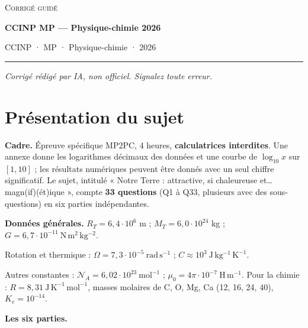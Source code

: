 \documentclass[11pt,a4paper]{article}
\begin{document}
\thispagestyle{plain}
\begin{center}
  {\small\scshape Corrigé guidé}\par\smallskip
  {\LARGE\bfseries CCINP MP — Physique-chimie 2026\par}\medskip
  {\large CCINP · MP · Physique-chimie · 2026\par}
\end{center}
\vspace{2pt}\hrule\vspace{8pt}

\emph{Corrigé rédigé par IA, non officiel. Signalez toute erreur.}

\hypertarget{pruxe9sentation-du-sujet}{%
\section{Présentation du sujet}\label{pruxe9sentation-du-sujet}}

\textbf{Cadre.} Épreuve spécifique MP2PC, 4 heures, \textbf{calculatrices interdites}. Une annexe donne les logarithmes décimaux des données et une courbe de \(\log_{10}x\) sur \([1,10]\) ; les résultats numériques peuvent être donnés avec un seul chiffre significatif. Le sujet, intitulé « Notre Terre : attractive, si chaleureuse et\ldots{} magn(if)(ét)ique », compte \textbf{33 questions} (Q1 à Q33, plusieurs avec des sous-questions) en six parties indépendantes.

\textbf{Données générales.} \(R_T=6{,}4\cdot10^6\) m ; \(M_T=6{,}0\cdot10^{24}\) kg ; \(G=6{,}7\cdot10^{-11}\ \mathrm{N\,m^2\,kg^{-2}}\).

Rotation et thermique : \(\Omega=7{,}3\cdot10^{-5}\ \mathrm{rad\,s^{-1}}\) ; \(C\approx10^3\ \mathrm{J\,kg^{-1}\,K^{-1}}\).

Autres constantes : \(\mathcal N_A=6{,}02\cdot10^{23}\ \mathrm{mol^{-1}}\) ; \(\mu_0=4\pi\cdot10^{-7}\ \mathrm{H\,m^{-1}}\). Pour la chimie : \(R=8{,}31\ \mathrm{J\,K^{-1}\,mol^{-1}}\), masses molaires de C, O, Mg, Ca (12, 16, 24, 40), \(K_e=10^{-14}\).

\textbf{Les six parties.}
\end{document}
